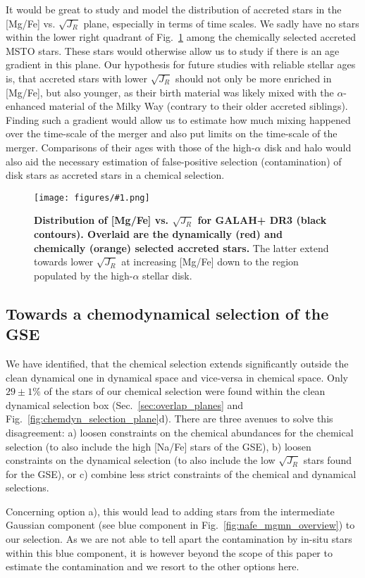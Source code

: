 \documentclass[fleqn,usenatbib]{mnras}
\newcommand{\codeicon}{{\faCloudDownload}}
\newcommand{\codelink}[1]{\href{https://github.com/svenbuder/buder_galah_accreted_chemistry/tree/main/figures/#1.ipynb}{\codeicon}\,\,}
\newcommand{\oscaption}[2]{\caption{#2 \codelink{#1}}}
\newcommand{\figurecolumnwidth}[3]{\begin{figure} \centering \texttt{[image: figures/\#1.png]}\oscaption{#2}{#3}\label{fig:#1} \end{figure}}
\begin{document}
It would be great to study and model the distribution of accreted stars in the [Mg/Fe] vs. $\sqrt{J_R}$ plane, especially in terms of time scales. We sadly have no stars within the lower right quadrant of Fig.~\ref{fig:overlap_mgfe_sqrtjr} among the chemically selected accreted MSTO stars. These stars would otherwise allow us to study if there is an age gradient in this plane. Our hypothesis for future studies with reliable stellar ages is, that accreted stars with lower $\sqrt{J_R}$ should not only be more enriched in [Mg/Fe], but also younger, as their birth material was likely mixed with the $\alpha$-enhanced material of the Milky Way (contrary to their older accreted siblings). Finding such a gradient would allow us to estimate how much mixing happened over the time-scale of the merger and also put limits on the time-scale of the merger. Comparisons of their ages with those of the high-$\alpha$ disk and halo would also aid the necessary estimation of false-positive selection (contamination) of disk stars as accreted stars in a chemical selection.

\figurecolumnwidth{overlap_mgfe_sqrtjr}{chronochemodynamic_comparison}{
\textbf{Distribution of [Mg/Fe] vs. $\sqrt{J_R}$ for GALAH+ DR3 (black contours). Overlaid are the dynamically (red) and chemically (orange) selected accreted stars.} The latter extend towards lower $\sqrt{J_R}$ at increasing [Mg/Fe] down to the region populated by the high-$\alpha$ stellar disk.
}

\subsection{Towards a chemodynamical selection of the GSE} \label{sec:towards_chemodyn}

We have identified, that the chemical selection extends significantly outside the clean dynamical one in dynamical space and vice-versa in chemical space. Only $29\pm1\%$ of the stars of our chemical selection were found within the clean dynamical selection box (Sec.~\ref{sec:overlap_planes} and Fig.~\ref{fig:chemdyn_selection_plane}d). There are three avenues to solve this disagreement:
a) loosen constraints on the chemical abundances for the chemical selection (to also include the high [Na/Fe] stars of the GSE), 
b) loosen constraints on the dynamical selection (to also include the low $\sqrt{J_R}$ stars found for the GSE), or 
c) combine less strict constraints of the chemical and dynamical selections.

Concerning option a), this would lead to adding stars from the intermediate Gaussian component (see blue component in Fig.~\ref{fig:nafe_mgmn_overview}) to our selection. As we are not able to tell apart the contamination by in-situ stars within this blue component, it is however beyond the scope of this paper to estimate the contamination and we resort to the other options here.
\end{document}
